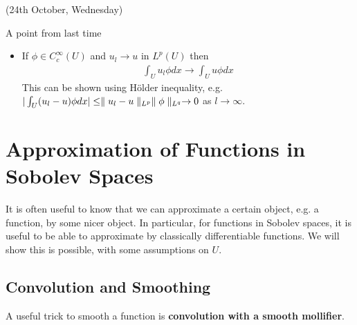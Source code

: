 \documentclass[10pt,a4paper]{report}
\begin{document}
\newday

(24th October, Wednesday)
\s

A point from last time 
\begin{itemize}
\item If $\phi \in C_c^{\infty} (U)$ and $u_l \rightarrow u$ in $L^p(U)$ then
\begin{align*}
\int_U u_l \phi dx \rightarrow \int_U u\phi dx
\end{align*}
This can be shown using H\"{o}lder inequality, e.g. $|\int_U (u_l -u)\phi dx| \leq \parallel u_l - u \parallel_{L^p} \parallel \phi \parallel_{L^q} \rightarrow 0$ as $l\rightarrow \infty$.
\end{itemize}
\s

\section*{Approximation of Functions in Sobolev Spaces}

It is often useful to know that we can approximate a certain object, e.g. a function, by some nicer object. In particular, for functions in Sobolev spaces, it is useful to be able to approximate by classically differentiable functions. We will show this is possible, with some assumptions on $U$.

\subsection*{Convolution and Smoothing}

A useful trick to smooth a function is \textbf{convolution with a smooth mollifier}.
\s
\end{document}
